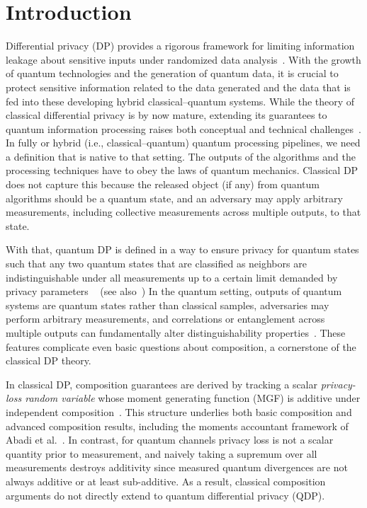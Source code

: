 \documentclass[11pt]{article}
\theoremstyle{plain}
\theoremstyle{remark}
\newcommand{\edit}[1]{{\color{black} #1}}
\begin{document}
\tableofcontents

\section{Introduction}
\label{sec:introduction}

Differential privacy (DP) provides a rigorous framework for limiting information leakage about sensitive inputs under randomized data analysis~\citep{DworkMNS06,DworkKMMN06}. \edit{With the growth of quantum technologies and the generation of quantum data, it is crucial to protect sensitive information related to the data generated and the data that is fed into these developing hybrid classical--quantum systems.}
While the theory of classical differential privacy is by now mature, extending its guarantees to quantum information processing raises both conceptual and technical challenges~\citep{QDP_computation17}.
In fully or hybrid (i.e., classical--quantum) quantum processing pipelines, we need a definition that is native to that setting. The outputs of the algorithms and the processing techniques have to obey the laws of quantum mechanics. 
Classical DP does not capture this because the released object (if any) from quantum algorithms should be a quantum state, and an adversary may apply arbitrary measurements, including collective measurements across multiple outputs, to that state.

\edit{With that, quantum DP is defined in a way to ensure privacy for quantum states such that any two quantum states that are classified as neighbors are indistinguishable under all measurements up to a certain limit demanded by privacy parameters ~\citep{QDP_computation17,hirche2022quantum} (see also~\Cref{def:qdp-povm})}
In the quantum setting, outputs of quantum systems are quantum states rather than classical samples, adversaries may perform arbitrary measurements, and correlations or entanglement across multiple outputs can fundamentally alter distinguishability properties~\citep{NC00,KSV02}.
These features complicate even basic questions about composition, a cornerstone of the classical DP theory.

In classical DP, composition guarantees are derived by tracking a scalar \emph{privacy-loss random variable} whose moment generating function (MGF) is additive under independent composition~\citep{DworkRoVa10}.
This structure underlies both basic composition and advanced composition results, including the moments accountant framework of Abadi et al.~\citep{AbadiChGoMcMiTaZh16}.
In contrast, for quantum channels privacy loss is not a scalar quantity prior to measurement, and naively taking a supremum over all measurements destroys additivity since measured quantum divergences are not always additive or at least sub-additive.
As a result, classical composition arguments do not directly extend to quantum differential privacy (QDP).
\end{document}
